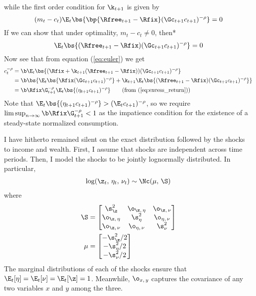 while the first order condition for $\k_{t+1}$ is given by
\begin{equation}\label{eq:excess_return}
    (m_t - c_t)\E_{t}\bs{\bp{\Rfree_{t+1} - \Rfix}(\Gc_{t+1}c_{t+1})^{-\rho}} = 0
\end{equation}
If we can show that under optimality, $m_t - c_t \neq 0$, then*
\[
\E_{t}\bs{(\Rfree_{t+1} - \Rfix)(\Gc_{t+1}c_{t+1})^{-\rho}} = 0
\]
Now see that from equation (\ref{eq:euler}) we get
\begin{align*}
    c_{t}^{-\rho} &= \b \E_{t}\bs{(\Rfix + \k_{t+1}(\Rfree_{t+1} - \Rfix))(\Gc_{t+1}c_{t+1})^{-\rho}}\\
    &= \b \bs{\E_{t}\bs{\Rfix(\Gc_{t+1}c_{t+1})^{-\rho}} + \k_{t+1}\E_{t}\bs{(\Rfree_{t+1} - \Rfix)(\Gc_{t+1}c_{t+1})^{-\rho}}}\\
    &= \b\Rfix\G_{t+1}^{-\rho}\E_{t}\bs{(\eta_{t+1}c_{t+1})^{-\rho}} \tag{from (\ref{eq:excess_return})}
\end{align*}
Note that $\E_{t}\bs{(\eta_{t+1}c_{t+1})^{-\rho}} > (\E_{t}c_{t+1})^{-\rho}$, so we require $\limsup_{n\to \infty}\b\Rfix\G_{t+1}^{-\rho} < 1$ as the impatience condition for the existence of a steady-state normalized consumption.

I have hitherto remained silent on the exact distribution followed by the shocks to income and wealth. First, I assume that shocks are independent across time periods. Then, I model the shocks to be jointly lognormally distributed. In particular,
\begin{align*}
    \log (\z_t,\,\eta_t,\,\nu_t) \sim \Nc(\mu,\,\S)
\end{align*}
where
\begin{align*}
    \S &= \begin{bmatrix}
        \s_{\z}^2 & \o_{\z,\,\eta} & \o_{\z,\,\nu}\\
        \o_{\z,\,\eta} & \s_{\eta}^2 & \o_{\eta,\,\nu}\\
        \o_{\z,\,\nu} & \o_{\eta,\,\nu} & \s_{\nu}^2
    \end{bmatrix}\\
    \mu &= \begin{bmatrix}
        -\s_{\z}^2 / 2\\
        -\s_{\eta}^2 / 2\\
        -\s_{\nu}^2 / 2
    \end{bmatrix}
\end{align*}
The marginal distributions of each of the shocks ensure that $\E_t[\eta] = \E_t[\nu] = \E_t[\z] = 1$. Meanwhile, $\o_{x,\,y}$ captures the covariance of any two variables $x$ and $y$ among the three.

